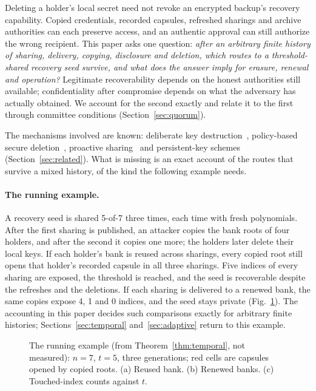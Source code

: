 \documentclass[pdflatex,sn-mathphys-num]{sn-jnl}%
\theoremstyle{plain}
\theoremstyle{definition}
\begin{document}
Deleting a holder's local secret need not revoke an encrypted backup's recovery capability. Copied credentials, recorded capsules, refreshed sharings and archive authorities can each preserve access, and an authentic approval can still authorize the wrong recipient. This paper asks one question: \emph{after an arbitrary finite history of sharing, delivery, copying, disclosure and deletion, which routes to a threshold-shared recovery seed survive, and what does the answer imply for erasure, renewal and operation?} Legitimate recoverability depends on the honest authorities still available; confidentiality after compromise depends on what the adversary has actually obtained. We account for the second exactly and relate it to the first through committee conditions (Section~\ref{sec:quorum}).

The mechanisms involved are known: deliberate key destruction~\cite{boneh1996,perlman2007}, policy-based secure deletion~\cite{cachin2013}, proactive sharing~\mbox{\cite{ostrovsky1991,herzberg1995,zhou2005,marsh2004}} and persistent-key schemes~\cite{dodis2024,dodisstandard2024,backendal2026} (Section~\ref{sec:related}). What is missing is an exact account of the routes that survive a mixed history, of the kind the following example needs.

\paragraph{The running example.}
A recovery seed is shared 5-of-7 three times, each time with fresh polynomials. After the first sharing is published, an attacker copies the bank roots of four holders, and after the second it copies one more; the holders later delete their local keys. If each holder's bank is reused across sharings, every copied root still opens that holder's recorded capsule in all three sharings. Five indices of every sharing are exposed, the threshold is reached, and the seed is recoverable despite the refreshes and the deletions. If each sharing is delivered to a renewed bank, the same copies expose 4, 1 and 0 indices, and the seed stays private (Fig.~\ref{fig:worked}). The accounting in this paper decides such comparisons exactly for arbitrary finite histories; Sections~\ref{sec:temporal} and~\ref{sec:adaptive} return to this example.

\begin{figure}[t]
\centering
\figbox{}
\caption{The running example (from Theorem~\ref{thm:temporal}, not measured): $n=7$, $t=5$, three generations; red cells are capsules opened by copied roots. (a) Reused bank. (b) Renewed banks. (c) Touched-index counts against $t$.}\label{fig:worked}
\end{figure}
\end{document}
